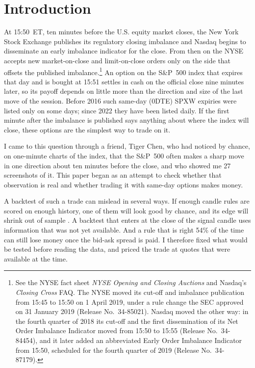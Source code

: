 \documentclass[12pt,letterpaper]{article}
\newif\ifblind
\begin{document}
\section{Introduction}
\label{sec:intro}

At 15:50~ET, ten minutes before the U.S. equity market closes, the New York
Stock Exchange publishes its regulatory closing imbalance and Nasdaq begins to
disseminate an early imbalance indicator for the close. From then on the NYSE
accepts new market-on-close and limit-on-close orders only on the side that
offsets the published imbalance.\footnote{See the NYSE fact sheet \emph{NYSE Opening and
Closing Auctions} and Nasdaq's \emph{Closing Cross} FAQ. The NYSE moved its
cut-off and imbalance publication from 15:45 to 15:50 on 1 April 2019, under a rule
change the SEC approved on 31 January 2019 (Release No.~34-85021). Nasdaq moved
the other way: in the fourth quarter of 2018 its cut-off and the first
dissemination of its Net Order Imbalance Indicator moved from 15:50 to 15:55
(Release No.~34-84454), and it later added an abbreviated Early Order Imbalance
Indicator from 15:50, scheduled for the fourth quarter of 2019 (Release
No.~34-87179).} An option on the
S\&P~500 index that expires that day and is bought at 15:51 settles in cash on
the official close nine minutes later, so its payoff depends on little more than
the direction and size of the last move of the session. Before 2016 such
same-day (0DTE) SPXW expiries were listed only on some days; since 2022 they have
been listed daily. If the first minute after the imbalance is published says anything about where
the index will close, these options are the simplest way to trade on it.

I came to this question through a friend\ifblind\else, Tiger Chen\fi, who had
noticed by chance, on one-minute charts of the index, that the S\&P~500 often
makes a sharp move in one direction about ten minutes before the close, and who
showed me 27 screenshots of it. This paper began as an attempt to check whether
that observation is real and whether trading it with same-day options makes
money.

A backtest of such a trade can mislead in several ways. If enough candle rules
are scored on enough history, one of them will look good by chance, and its
edge will shrink out of sample \citep{harvey2016}. A backtest that enters at
the close of the signal candle uses information that was not yet available. And
a rule that is right 54\% of the time can still lose money once the bid-ask
spread is paid. I therefore fixed what would be tested before reading the data,
and priced the trade at quotes that were available at the time.
\end{document}
